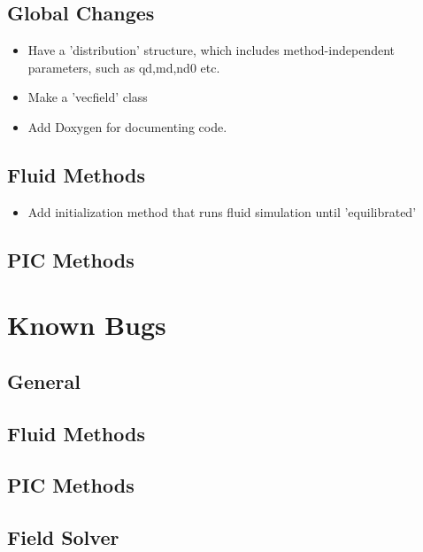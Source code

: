 \subsection{Global Changes}
\begin{itemize}
\item Have a 'distribution' structure, which includes method-independent parameters, such as qd,md,nd0 etc.
\item Make a 'vecfield' class
\item Add Doxygen for documenting code.
\end{itemize}

\subsection{Fluid Methods}
\begin{itemize}
\item Add initialization method that runs fluid simulation until 'equilibrated'
\end{itemize}
\subsection{PIC Methods}

\section{Known Bugs}

\subsection{General}

\subsection{Fluid Methods}

\subsection{PIC Methods}

\subsection{Field Solver}